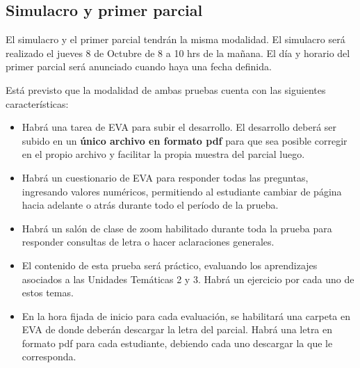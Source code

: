 \documentclass[a4paper,11pt,twocolumn]{article}
\begin{document}
\subsection{Simulacro y primer parcial}

El simulacro y el primer parcial tendrán la misma modalidad. El simulacro será realizado el jueves 8 de Octubre de 8 a 10 hrs de la mañana. El día y horario del primer parcial será anunciado cuando haya una fecha definida.

Está previsto que la modalidad de ambas pruebas cuenta con las siguientes características:
\begin{itemize}
\item Habrá una tarea de EVA para subir el desarrollo. El desarrollo deberá ser subido en un \textbf{único archivo en formato pdf} para que sea posible corregir en el propio archivo y facilitar la propia muestra del parcial luego.
%
\item Habrá un cuestionario de EVA para responder todas las preguntas, ingresando valores numéricos, permitiendo al estudiante cambiar de página hacia adelante o atrás durante todo el período de la prueba.
%
\item Habrá un salón de clase de zoom habilitado durante toda la prueba para responder consultas de letra o hacer aclaraciones generales.
%
\item El contenido de esta prueba será práctico, evaluando los aprendizajes asociados a las Unidades Temáticas 2 y 3. Habrá un ejercicio por cada uno de estos temas.
%
\item En la hora fijada de inicio para cada evaluación, se habilitará una carpeta en EVA de donde deberán descargar la letra del parcial. Habrá una letra en formato pdf para cada estudiante, debiendo cada uno descargar la que le corresponda.
\end{itemize}
\end{document}
